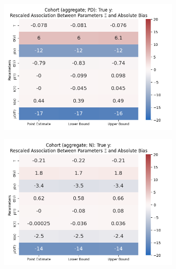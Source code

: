 \documentclass[12pt]{article}
\begin{document}
\begin{figure}[H]
	\begin{subfigure}[t]{0.23\linewidth}
		\centering
		\caption{}
		\includegraphics[scale=0.25]{VEMethod_Drivers1b_FEest_Realistic_Li_MSpec_Heatmap3.png}
	\end{subfigure}
	\begin{subfigure}[t]{0.23\linewidth}
		\centering
		\caption{}
		\includegraphics[scale=0.25]{VEMethod_Drivers1b_FEest_Realistic_Li_MSpec_Heatmap4.png}
	\end{subfigure}
	

\end{figure}
\end{document}
